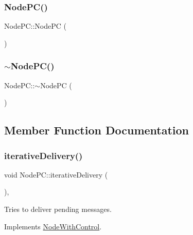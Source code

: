 \subsubsection{\texorpdfstring{Node\+P\+C()}{NodePC()}}
{\footnotesize\ttfamily Node\+P\+C\+::\+Node\+PC (\begin{DoxyParamCaption}{ }\end{DoxyParamCaption})}

\mbox{\label{class_node_p_c_a823ec7244202157115f6d587c0c565dc}} 
\subsubsection{\texorpdfstring{$\sim$\+Node\+P\+C()}{~NodePC()}}
{\footnotesize\ttfamily Node\+P\+C\+::$\sim$\+Node\+PC (\begin{DoxyParamCaption}{ }\end{DoxyParamCaption})\hspace{0.3cm}{\ttfamily [virtual]}}



\subsection{Member Function Documentation}
\mbox{\label{class_node_p_c_a7ac363db597ebadd3b18dd4343440aa1}} 
\subsubsection{\texorpdfstring{iterative\+Delivery()}{iterativeDelivery()}}
{\footnotesize\ttfamily void Node\+P\+C\+::iterative\+Delivery (\begin{DoxyParamCaption}{ }\end{DoxyParamCaption})\hspace{0.3cm}{\ttfamily [protected]}, {\ttfamily [virtual]}}



Tries to deliver pending messages. 



Implements \hyperlink{class_node_with_control_a4f78078272b90937e0746c797443b37d}{Node\+With\+Control}.

